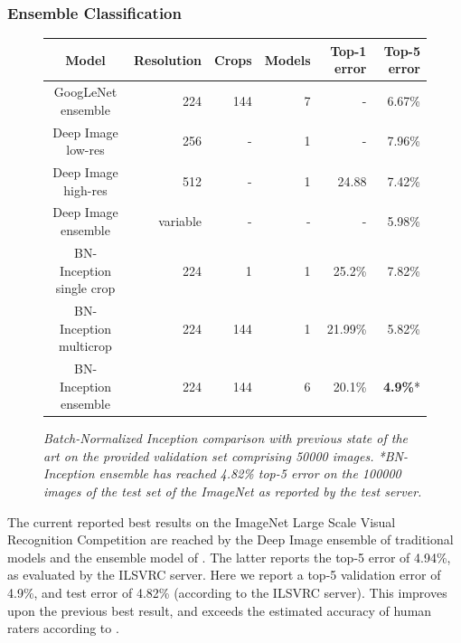 \documentclass[twocolumn]{article}
\begin{document}
\subsubsection{Ensemble Classification}

\begin{figure}[t!]
\centering
\begin{tabular}{c | r  r  r  r  r }
\hline
Model & Resolution & Crops & Models & Top-1 error & Top-5 error \\ 
\hline
{GoogLeNet ensemble} & 224 & 144 & 7 & - & 6.67\% \\
{Deep Image low-res} & 256 & - & 1 & - & 7.96\% \\
{Deep Image high-res} & 512 & - & 1 & 24.88 & 7.42\% \\
{Deep Image ensemble} & variable & - & - & - & 5.98\% \\
{BN-Inception single crop} & 224 & 1 & 1 & 25.2\% & 7.82\% \\
{BN-Inception multicrop} & 224 & 144 & 1 & 21.99\% & 5.82\% \\
{BN-Inception ensemble} & 224 & 144 & 6 & 20.1\% & {\bf 4.9\%}* \\
\hline
\end{tabular}
\caption{\em Batch-Normalized Inception comparison with previous state of the art on the provided validation set comprising 50000 images.
  *BN-Inception ensemble has reached 4.82\% top-5 error on the 100000 images of the test set of the ImageNet as reported by the test server. }
\label{fig-classification-comparison}
\end{figure}

The current reported best results on the ImageNet Large Scale Visual Recognition
Competition are reached by the Deep Image ensemble of traditional models
\cite{deepimage} and the ensemble model of \cite{msr}. The latter reports the
top-5 error of 4.94\%, as evaluated by the ILSVRC server. Here we report a top-5
validation error of 4.9\%, and test error of 4.82\% (according to the ILSVRC
server). This improves upon the previous best result,
and
exceeds the estimated accuracy of human raters according to \cite{imagenet}.

\end{document}
